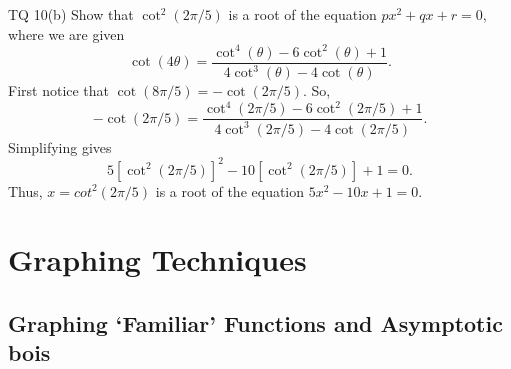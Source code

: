 \documentclass[oneside]{book}
\begin{document}
\begin{example}{TQ 10(b)}{}
  Show that \(\cot^2(2\pi/5)\) is a root of the equation \(px^2+qx+r=0\), where we are given 
  \[\cot(4\theta)=\frac{\cot^4(\theta)-6\cot^2(\theta)+1}{4\cot^3(\theta)-4\cot(\theta)}.\]
  First notice that \(\cot(8\pi/5)=-\cot(2\pi/5)\). So, 
  \[-\cot(2\pi/5)=\frac{\cot^4(2\pi/5)-6\cot^2(2\pi/5)+1}{4\cot^3(2\pi/5)-4\cot(2\pi/5)}.\]
  Simplifying gives 
  \[5[\cot^2(2\pi/5)]^2-10[\cot^2(2\pi/5)]+1=0.\]
  Thus, \(x=cot^2(2\pi/5)\) is a root of the equation \(5x^2-10x+1=0\). 
\end{example}



\chapter{Graphing Techniques}
\section{Graphing `Familiar' Functions and Asymptotic bois}
\end{document}
